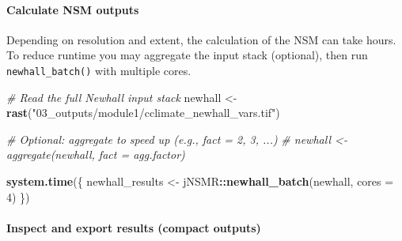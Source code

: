 \documentclass[
  10pt,
  b5paper,
  oneside]{book}
\newenvironment{Shaded}{\begin{snugshade}}{\end{snugshade}}
\newcommand{\AttributeTok}[1]{\textcolor[rgb]{0.13,0.29,0.53}{#1}}
\newcommand{\CommentTok}[1]{\textcolor[rgb]{0.56,0.35,0.01}{\textit{#1}}}
\newcommand{\ConstantTok}[1]{\textcolor[rgb]{0.56,0.35,0.01}{#1}}
\newcommand{\DecValTok}[1]{\textcolor[rgb]{0.00,0.00,0.81}{#1}}
\newcommand{\FunctionTok}[1]{\textcolor[rgb]{0.13,0.29,0.53}{\textbf{#1}}}
\newcommand{\NormalTok}[1]{#1}
\newcommand{\OtherTok}[1]{\textcolor[rgb]{0.56,0.35,0.01}{#1}}
\newcommand{\SpecialCharTok}[1]{\textcolor[rgb]{0.81,0.36,0.00}{\textbf{#1}}}
\newcommand{\StringTok}[1]{\textcolor[rgb]{0.31,0.60,0.02}{#1}}
\begin{document}
\begin{Shaded}
\end{Shaded}

\paragraph*{Calculate NSM outputs}\label{calculate-nsm-outputs}

Depending on resolution and extent, the calculation of the NSM can take hours. To reduce runtime you may aggregate the input stack (optional), then run \texttt{newhall\_batch()} with multiple cores.

\begin{Shaded}
\begin{Highlighting}[]
\CommentTok{\# Read the full Newhall input stack}
\NormalTok{newhall }\OtherTok{\textless{}{-}} \FunctionTok{rast}\NormalTok{(}\StringTok{"03\_outputs/module1/cclimate\_newhall\_vars.tif"}\NormalTok{)}

\CommentTok{\# Optional: aggregate to speed up (e.g., fact = 2, 3, ...)}
\CommentTok{\# newhall \textless{}{-} aggregate(newhall, fact = agg.factor)}

\FunctionTok{system.time}\NormalTok{(\{}
\NormalTok{  newhall\_results }\OtherTok{\textless{}{-}}\NormalTok{ jNSMR}\SpecialCharTok{::}\FunctionTok{newhall\_batch}\NormalTok{(newhall, }\AttributeTok{cores =} \DecValTok{4}\NormalTok{)}
\NormalTok{\})}
\end{Highlighting}
\end{Shaded}

\paragraph*{Inspect and export results (compact outputs)}\label{inspect-and-export-results-compact-outputs}
\end{document}
